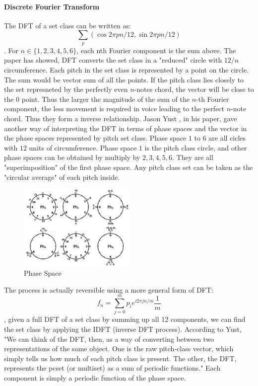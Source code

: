 \documentclass[12pt]{report}
\theoremstyle{definition}
\begin{document}
\paragraph*{Discrete Fourier Transform}
The DFT of a set class can be written as:
\[\sum_p (\cos 2\pi pn/12, \sin 2\pi pn/12)\].
For $n\in \{1,2,3,4,5,6\}$, each nth Fourier component is the sum above.
The paper has showed, DFT converts the set class in a "reduced" circle with 
$12/n$ circumference. Each pitch in the set class is represented by a point
on the circle. The sum would be vector sum of all the points. If the pitch 
class lies closely to the set represneted by the perfectly even $n$-notes chord,
the vector will be close to the $0$ point. Thus the larger the magnitude of the
sum of the $n$-th Fourier component, the less movement is required in voice 
leading to the perfect $n$-note chord. Thus they form a inverse relationship.
Jason Yust , in his paper, gave another way of interpreting the DFT in terms of 
phase spaces and the vector in the phase spaces represented by pitch set class. Phase space $1$ to $6$
are all cicles with $12$ units of circumference. Phase space $1$ is the pitch class
circle, and other phase spaces can be obtained by multiply by $2,3,4,5,6$. They are
all "superimposition" of the first phase space. Any pitch class set can be taken as
the "circular average" of each pitch inside.
\begin{figure}[h]
    \centering
    \includegraphics[width=0.5\textwidth]{ph_s.png}
    \caption{Phase Space}
\end{figure}
The process is actually reversible using a more general form of DFT:
\[f_n = \sum_{j=0}^{m} p_i e^{i2\pi jn/m}\frac{1}{m}\], given a full DFT
of a set class by summing up all 12 components, we can find the set class 
by applying the IDFT (inverse DFT process). According to Yust, 
"We can think of the DFT, then, as a way of converting between two 
representations of the same object. One is the raw pitch-class vector, 
which simply tells us how much of each pitch class is present. 
The other, the DFT, represents the pcset (or multiset) as a sum of 
periodic functions." Each component is simply a periodic function of
the phase space. 
\end{document}
